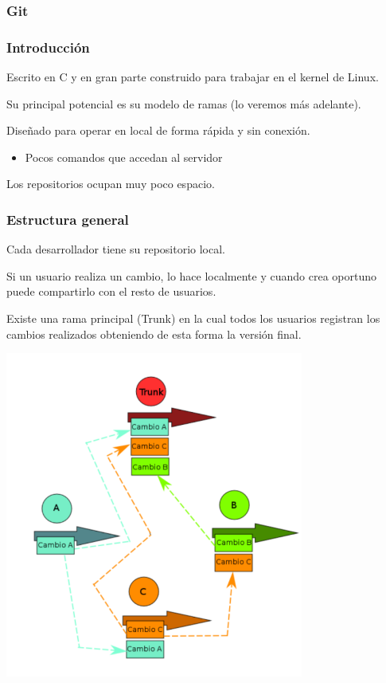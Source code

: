 \subsubsection{Git}
\subsubsection*{\hspace{10pt} Introducción}
Escrito en C y en gran parte construido para trabajar en el kernel de Linux.

Su principal potencial es su modelo de ramas (lo veremos más adelante).

Diseñado para operar en local de forma rápida y sin conexión.

\begin{itemize}
	\item Pocos comandos que accedan al servidor
\end{itemize}

Los repositorios ocupan muy poco espacio.
\subsubsection*{\hspace{10pt}Estructura general}

	Cada desarrollador tiene su repositorio local.
	
	Si un usuario realiza un cambio, lo hace localmente y cuando crea oportuno puede compartirlo con el resto de usuarios.
	
	Existe una rama principal (Trunk) en la cual todos los usuarios registran los cambios realizados obteniendo de esta forma la versión final.
\begin{center}
	\includegraphics{"Temas/Tema 1/screenshot004"}
\end{center}

